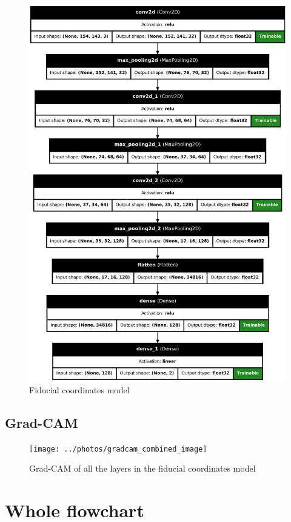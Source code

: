 \begin{figure}[H]
    \centering
    \includegraphics[height=.8\paperheight]{../photos/fiducial_coords_model}
    \caption[originalRainbow]{Fiducial coordinates model}
    \label{fig:fiducial_coords_model}
\end{figure}
\newpage
\subsection{Grad-CAM}\label{subsec:gradcam}
\begin{figure}[!ht]
    \centering
    \texttt{[image: ../photos/gradcam\_combined\_image]}
    \caption[originalRainbow]{Grad-CAM of all the layers in the fiducial coordinates model}
    \label{fig:gradcam}
\end{figure}


\section{Whole flowchart}\label{sec:whole-flowchart}

